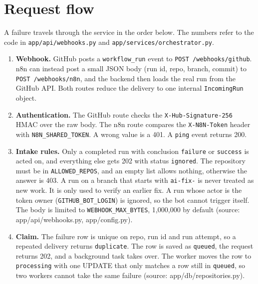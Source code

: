 \section{Request flow}



A failure travels through the service in the order below. The numbers refer to the code in \texttt{app/\allowbreak{}api/\allowbreak{}webhooks.\allowbreak{}py} and \texttt{app/\allowbreak{}services/\allowbreak{}orchestrator.\allowbreak{}py}.

\begin{enumerate}[leftmargin=*, itemsep=2pt]
\item \textbf{Webhook.} GitHub posts a \texttt{workflow\_\allowbreak{}run} event to \texttt{POST /\allowbreak{}webhooks/\allowbreak{}github}. n8n can instead post a small JSON body (run id, repo, branch, commit) to \texttt{POST /\allowbreak{}webhooks/\allowbreak{}n8n}, and the backend then loads the real run from the GitHub API. Both routes reduce the delivery to one internal \texttt{IncomingRun} object.
\item \textbf{Authentication.} The GitHub route checks the \texttt{X-\allowbreak{}Hub-\allowbreak{}Signature-\allowbreak{}256} HMAC over the raw body. The n8n route compares the \texttt{X-\allowbreak{}N8N-\allowbreak{}Token} header with \texttt{N8N\_\allowbreak{}SHARED\_\allowbreak{}TOKEN}. A wrong value is a 401. A \texttt{ping} event returns 200.
\item \textbf{Intake rules.} Only a completed run with conclusion \texttt{failure} or \texttt{success} is acted on, and everything else gets 202 with status \texttt{ignored}. The repository must be in \texttt{ALLOWED\_\allowbreak{}REPOS}, and an empty list allows nothing, otherwise the answer is 403. A run on a branch that starts with \texttt{ai-\allowbreak{}fix-\allowbreak{}} is never treated as new work. It is only used to verify an earlier fix. A run whose actor is the token owner (\texttt{GITHUB\_\allowbreak{}BOT\_\allowbreak{}LOGIN}) is ignored, so the bot cannot trigger itself. The body is limited to \texttt{WEBHOOK\_\allowbreak{}MAX\_\allowbreak{}BYTES}, 1,000,000 by default (source: app/\allowbreak{}api/\allowbreak{}webhooks.py, app/\allowbreak{}config.py).
\item \textbf{Claim.} The failure row is unique on repo, run id and run attempt, so a repeated delivery returns \texttt{duplicate}. The row is saved as \texttt{queued}, the request returns 202, and a background task takes over. The worker moves the row to \texttt{processing} with one UPDATE that only matches a row still in \texttt{queued}, so two workers cannot take the same failure (source: app/\allowbreak{}db/\allowbreak{}repositories.py).

\end{enumerate}
